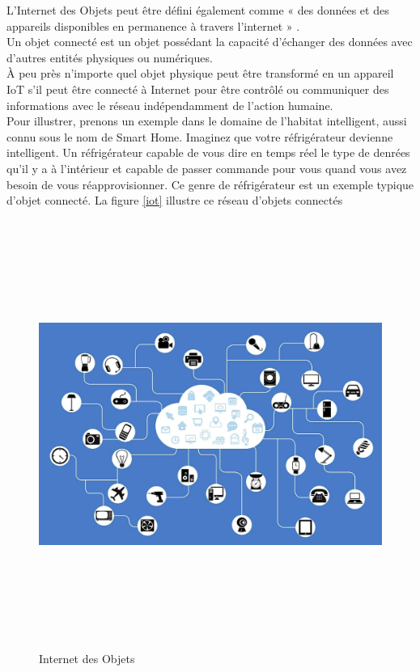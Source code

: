 L’Internet des Objets peut être déf{\kern0pt}ini également comme « des données et des appareils disponibles en permanence à travers l’internet » \cite{hu2016security}.\\
Un objet connecté est un objet possédant la capacité d’échanger des données avec d’autres entités physiques ou numériques.\\
À peu près n'importe quel objet physique peut être transformé en un appareil IoT s'il peut être connecté à Internet pour être contrôlé ou communiquer des informations avec le réseau indépendamment de l’action humaine.\\
Pour illustrer, prenons un exemple dans le domaine de l’habitat intelligent, aussi connu sous le nom de Smart Home. Imaginez que votre réfrigérateur devienne intelligent. Un réfrigérateur capable de vous dire en temps réel le type de denrées qu’il y a à l’intérieur et capable de passer commande pour vous quand vous avez besoin de vous réapprovisionner. Ce genre de réfrigérateur est un exemple typique d'objet connecté. La figure \ref{iot} illustre ce réseau d'objets connectés
	\begin{figure}[H]
		\begin{center}
			\includegraphics[width=16cm,height=14cm]{IMAGES/ORIGINALS/Internet_des_Objets_2}
		\end{center}
		\caption{Internet des Objets}
	\end{figure}	
